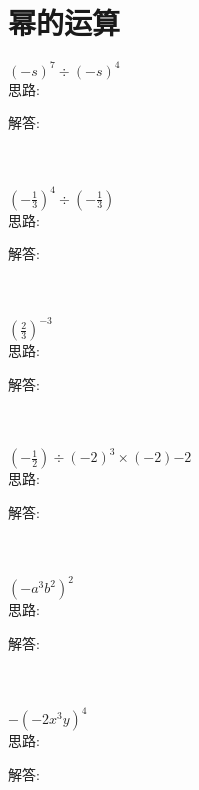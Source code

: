 \section{幂的运算}

\item {
    $ (-s)^7\div (-s)^4 $ 
    \ifshowSolution
        \fangsong{}
        \\
        思路:

        解答: 
    \else
        \\ \\ \\
    \fi
}

\item {
    $ (-\frac13)^4\div (-\frac13) $ 
    \ifshowSolution
        \fangsong{}
        \\
        思路:

        解答: 
    \else
        \\ \\ \\
    \fi
}

\item {
    $ (\frac23)^{-3} $ 
    \ifshowSolution
        \fangsong{}
        \\
        思路:

        解答: 
    \else
        \\ \\ \\
    \fi
}

\item {
    $ (-\frac12)\div (-2)^{3} \times (-2){-2} $ 
    \ifshowSolution
        \fangsong{}
        \\
        思路:

        解答: 
    \else
        \\ \\ \\
    \fi
}

\item {
    $ (-a^3b^2)^2$ 
    \ifshowSolution
        \fangsong{}
        \\
        思路:

        解答: 
    \else
        \\ \\ \\
    \fi
}

\item {
    $ -(-2x^3y)^4 $ 
    \ifshowSolution
        \fangsong{}
        \\
        思路:

        解答: 
    \else
        \\ \\ \\
    \fi
}

